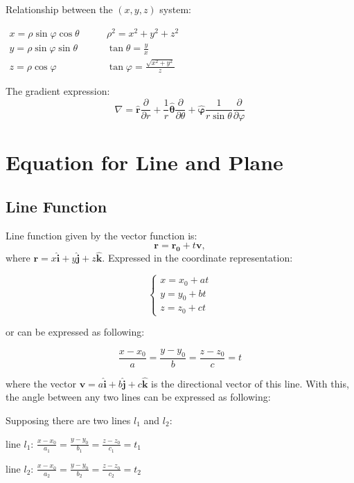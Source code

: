 \documentclass[UTF8,a4paper, 10pt, openany]{svmono}
\begin{document}
\begin{enumerate}
Relationship between the $(x, y, z)$ system:
\begin{center}
$\begin{array}{ll}
x = \rho \sin \varphi \cos \theta \qquad &  \rho ^2 = x^2+y^2+z^2\\
y = \rho \sin \varphi \sin \theta \qquad &  \tan \theta = \frac{y}{x}\\
z = \rho \cos \varphi  			\qquad &  \tan \varphi = \frac{\sqrt{x^2+y^2}}{z}
\end{array}$
\end{center}

The gradient expression:
\begin{equation}
\boxed{\nabla = \hat{\bm{r}}\frac{\partial }{\partial r} 
+ \frac{1}{r}\bm{\hat{\theta}}\frac{\partial }{\partial \theta}
+ \bm{\hat{\varphi}}\frac{1}{r\sin \theta}\frac{\partial }{\partial \varphi}}
\end{equation}
\end{enumerate}


\section{Equation for Line and Plane}
\subsection{Line Function}
Line function given by the vector function is:
\[\mathbf{r}=\mathbf{r_0}+t\mathbf{v},\]
where $\mathbf{r}=x\mathbf{\hat{i}}+y\mathbf{\hat{j}}+z\mathbf{\hat{k}}$.
Expressed in the coordinate representation:

\[\begin{cases}
x=x_0+at \\
y=y_0+bt \\
z=z_0+ct
\end{cases}\]

or can be expressed as following:

\[\frac{x-x_0}{a}=\frac{y-y_0}{b}=\frac{z-z_0}{c}=t\]

where the vector $\mathbf{v}=a\mathbf{\hat{i}}+b\mathbf{\hat{j}}+c\mathbf{\hat{k}}$ is the directional vector of this line. With this, the angle between any two lines can be expressed as following:

Supposing there are two lines $l_1$ and $l_2$:

\begin{center}
line $l_1$: $\frac{x-x_0}{a_1}=\frac{y-y_0}{b_1}=\frac{z-z_0}{c_1}=t_1$

line $l_2$: $\frac{x-x_0}{a_2}=\frac{y-y_0}{b_2}=\frac{z-z_0}{c_2}=t_2$
\end{center}
\end{document}
